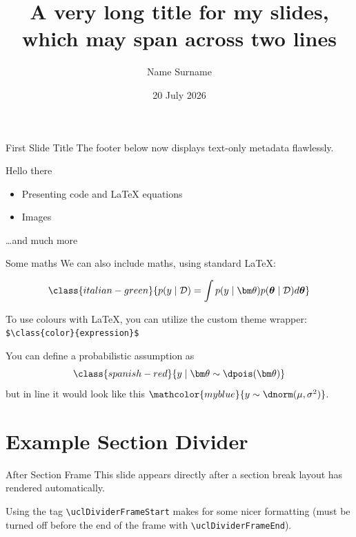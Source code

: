 \documentclass[10pt, aspectratio=1610]{beamer}
\title[A short title]{A very long title for my slides, which may span across two lines}
\author{Name Surname}
\date[20 Jul 2026]{20 July 2026}
\institute{Department of Statistical Science ~ | ~ University College London}
\begin{document}
\frame[plain]{\titlepage}

\begin{frame}{First Slide Title}
  The footer below now displays text-only metadata flawlessly.
\end{frame}

\begin{frame}{Hello there {}}
\begin{itemize}
\item
  Presenting code and LaTeX equations
\item
  Images
\end{itemize}

\ldots and much more
\end{frame}


\begin{frame}[fragile]{Some maths}
  We can also include maths, using standard \LaTeX:

  \[\class{italian-green}{p(y\mid\mathcal{D}) = \int p(y\mid\bm\theta)p(\boldsymbol\theta\mid\mathcal{D})d\boldsymbol\theta} \]

  To use colours with \LaTeX, you can utilize the custom theme wrapper:
  \texttt{\$\textbackslash{}class\{color\}\{expression\}\$}

  You can define a probabilistic assumption as
  \[\class{spanish-red}{y \mid \bm\theta \sim \dpois(\bm\theta)}\] 
  but in line it would look like this \(\mathcolor{myblue}{y\sim \dnorm(\mu,\sigma^2)}\).
\end{frame}

\section{Example Section Divider}

\begin{frame}{After Section Frame}
  This slide appears directly after a section break layout has rendered automatically.
\end{frame}

\begin{frame}{}

Using the tag \verb"\uclDividerFrameStart" makes for some nicer formatting (must be turned off before the end of the frame with
\verb"\uclDividerFrameEnd").

\uclDividerFrameEnd
\end{frame}
\end{document}
